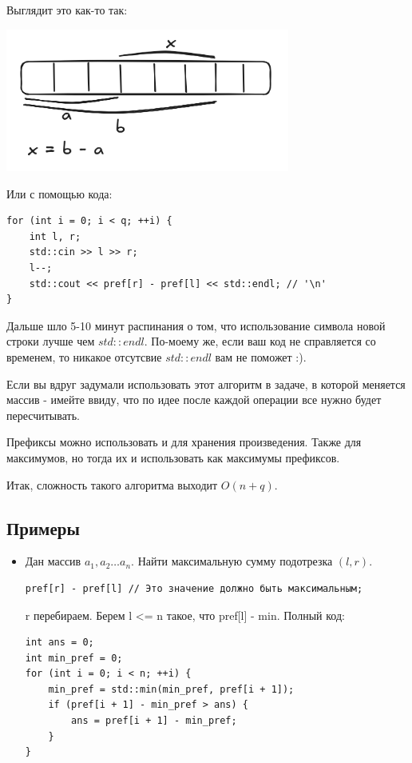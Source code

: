 \documentclass[a4paper,12pt]{article}
\begin{document}
Выглядит это как-то так:

\begin{center}
	\includegraphics[width=0.7\textwidth]{../assets/prefsums.png}
\end{center}

Или с помощью кода:

\begin{verbatim}
for (int i = 0; i < q; ++i) {
    int l, r;
    std::cin >> l >> r;
    l--;
    std::cout << pref[r] - pref[l] << std::endl; // '\n'
}
\end{verbatim}

Дальше шло 5-10 минут распинания о том, что использование символа
новой строки лучше чем $std::endl$.
По-моему же, если ваш код не справляется со временем, то никакое
отсутсвие $std::endl$ вам не поможет :).

Если вы вдруг задумали использовать этот алгоритм в задаче, в которой меняется
массив - имейте ввиду, что по идее после каждой операции все нужно будет
пересчитывать.

Префиксы можно использовать и для хранения произведения. Также для максимумов,
но тогда их и использовать как максимумы префиксов.

Итак, сложность такого алгоритма выходит $O(n + q)$.

\subsection{Примеры}
\begin{itemize}
	\item Дан массив $a_1, a_2 \dots a_n$. Найти максимальную сумму
	      подотрезка $(l,r)$.
	      \begin{verbatim}
pref[r] - pref[l] // Это значение должно быть максимальным;
          \end{verbatim}
	      r перебираем. Берем l <= n такое, что pref[l] - min.
	      Полный код:
	      \begin{verbatim}
int ans = 0;
int min_pref = 0;
for (int i = 0; i < n; ++i) {
    min_pref = std::min(min_pref, pref[i + 1]);
    if (pref[i + 1] - min_pref > ans) {
        ans = pref[i + 1] - min_pref;
    }
}
          \end{verbatim}
\end{itemize}
\end{document}

